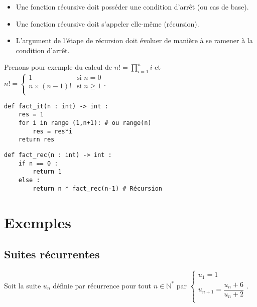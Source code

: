 \begin{methode}
\begin{itemize}
\item Une fonction récursive doit posséder une condition d'arrêt (ou cas de base).
\item Une fonction récursive doit s'appeler elle-même (récursion).
\item L'argument de l'étape de récursion doit évoluer de manière à se ramener à la condition d'arrêt.
\end{itemize}
\end{methode}
 
 
\begin{exemple} 
Prenons pour exemple du calcul de $n! = \prod\limits_{i=1}^{n} i$ et 
$n! = 
\left\{
\begin{array}{ll} 
1                        & \text{si } n=0 \\
n\times(n-1)! & \text{si } n\geq 1 \\
\end{array}
\right.
$.
  
\noindent\begin{minipage}[c]{.45\linewidth}
\begin{lstlisting}
def fact_it(n : int) -> int :
    res = 1
    for i in range (1,n+1): # ou range(n)
        res = res*i
    return res
\end{lstlisting}
\end{minipage} \hfill
\begin{minipage}[c]{.45\linewidth}
\begin{lstlisting}
def fact_rec(n : int) -> int :
    if n == 0 : 
        return 1
    else : 
        return n * fact_rec(n-1) # Récursion
\end{lstlisting}
\end{minipage} 
\end{exemple}

\section{Exemples}

\subsection{Suites récurrentes}
Soit la suite $u_n$ définie par récurrence pour tout $n\in\mathbb{N}^*$ par 
$
\left\{
\begin{array}{ll} 
u_1 = 1 \\
u_{n+1} = \dfrac{u_n + 6}{u_n + 2} \\
\end{array}
\right.
$.

